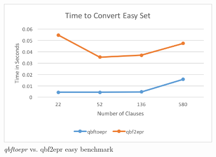 \begin{figure}[h]
\caption{\textit{qbftoepr} vs. qbf2epr easy benchmark}
\label{qbftoeprvsqbf2epreasy}
\begin{CenteredBox}
\includegraphics{qbftoeprvsqbf2epreasy.png}
\end{CenteredBox}
\end{figure}
